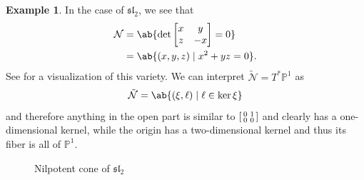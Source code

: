 \documentclass{amsart}
\theoremstyle{definition}
\newtheorem{exm}[thm]{Example}
\theoremstyle{remark}
\theoremstyle{plain}
\theoremstyle{definition}
\theoremstyle{remark}
\renewcommand{\P}{\mathbb{P}}
\newcommand{\mc}[1]{\mathcal{#1}}
\newcommand{\mf}[1]{\mathfrak{#1}}
\newcommand{\1}{\mathbf{1}}
\newcommand{\2}{\mathbf{2}}
\newcommand{\3}{\mathbf{3}}
\renewcommand{\sl}{\mf{sl}}
\begin{document}
\begin{exm}
    In the case of \(\sl_2\), we see that
    \begin{align*}
        \mc{N} &= \ab\{ \det \begin{bmatrix}
            x & y \\
            z & -x  
        \end{bmatrix} = 0 \} \\
            &= \ab\{ (x,y,z) \mid x^2 + yz = 0 \}.
    \end{align*}
    See  for a visualization of this variety. We can interpret \(\tilde{\mc{N}} = T^* \P^1\) as
    \[ \tilde{\mc{N}} = \ab\{ (\xi, \ell) \mid \ell \in \ker \xi \} \]
    and therefore anything in the open part is similar to \(\begin{bsmallmatrix}
        0 & 1 \\
        0 & 0
    \end{bsmallmatrix}\) and clearly has a one-dimensional kernel, while the origin has a two-dimensional kernel and thus its fiber is all of \(\P^1\).
    
    \begin{figure}[htpb]
    \begin{center}
    \end{center}
    \caption{Nilpotent cone of \(\sl_2\)}
    \label{fig:sl2-nilpotent-cone}
    \end{figure}
\end{exm}
\end{document}
